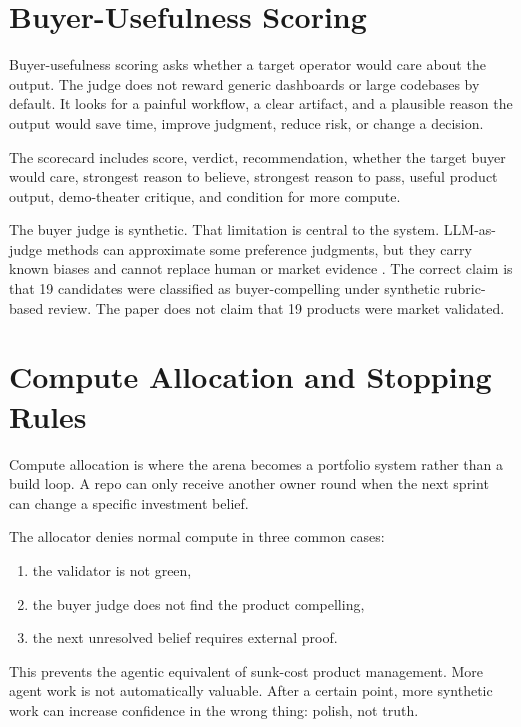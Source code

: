 \documentclass[11pt]{article}
\begin{document}
\section{Buyer-Usefulness Scoring}

Buyer-usefulness scoring asks whether a target operator would care about the output. The judge does not reward generic dashboards or large codebases by default. It looks for a painful workflow, a clear artifact, and a plausible reason the output would save time, improve judgment, reduce risk, or change a decision.

The scorecard includes score, verdict, recommendation, whether the target buyer would care, strongest reason to believe, strongest reason to pass, useful product output, demo-theater critique, and condition for more compute.

The buyer judge is synthetic. That limitation is central to the system. LLM-as-judge methods can approximate some preference judgments, but they carry known biases and cannot replace human or market evidence \cite{zheng2023llmjudge}. The correct claim is that 19 candidates were classified as buyer-compelling under synthetic rubric-based review. The paper does not claim that 19 products were market validated.

\section{Compute Allocation and Stopping Rules}

Compute allocation is where the arena becomes a portfolio system rather than a build loop. A repo can only receive another owner round when the next sprint can change a specific investment belief.

The allocator denies normal compute in three common cases:

\begin{enumerate}[leftmargin=1.5em]
  \item the validator is not green,
  \item the buyer judge does not find the product compelling,
  \item the next unresolved belief requires external proof.
\end{enumerate}

This prevents the agentic equivalent of sunk-cost product management. More agent work is not automatically valuable. After a certain point, more synthetic work can increase confidence in the wrong thing: polish, not truth.
\end{document}

